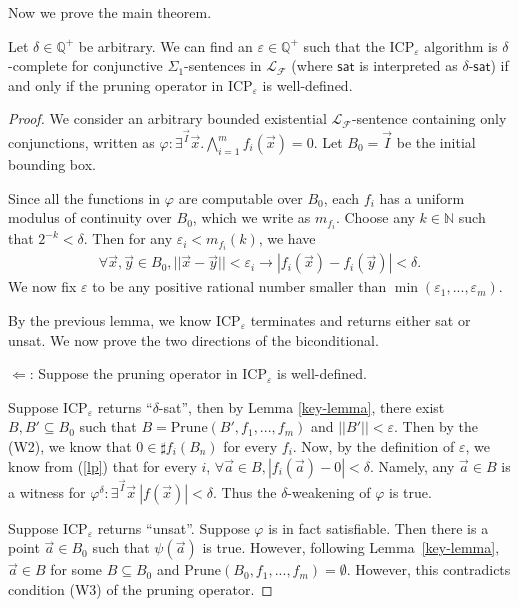 \documentclass[prodmode]{acmsmall} %
\begin{document}
Now we prove the main theorem. 
\begin{theorem}\label{main-theorem}
Let $\delta\in \mathbb{Q}^+$ be arbitrary. We can find an $\varepsilon\in \mathbb{Q}^+$ such that the $\mathrm{ICP}_{\varepsilon}$ algorithm is $\delta$-complete for conjunctive $\Sigma_1$-sentences in $\mathcal{L}_{\mathcal{F}}$ (where $\mathsf{sat}$ is interpreted as $\delta$-$\mathsf{sat}$) if and only if the pruning operator in ICP$_{\varepsilon}$ is well-defined. 
\end{theorem}
\begin{proof}
We consider an arbitrary bounded existential $\mathcal{L}_{\mathcal{F}}$-sentence containing only conjunctions, written as $\varphi: \exists^{\vec I}\vec x. \bigwedge_{i=1}^m f_i(\vec x) = 0$. Let $B_0 = \vec I$ be the initial bounding box. 

Since all the functions in $\varphi$ are computable over $B_0$, each $f_i$ has a uniform modulus of continuity over $B_0$, which we write as $m_{f_i}$. Choose any $k\in \mathbb{N}$ such that $2^{-k}<\delta$. Then for any $\varepsilon_i<m_{f_i}(k)$, we have 
\begin{eqnarray}\label{lp}
\forall \vec x, \vec y\in B_0, ||\vec x-\vec y||<\varepsilon_i\rightarrow |f_i(\vec x)-f_i(\vec y)|<\delta.
\end{eqnarray}
We now fix $\varepsilon$ to be any positive rational number smaller than $\min(\varepsilon_1,...,\varepsilon_m)$.
 
By the previous lemma, we know ICP$_{\varepsilon}$ terminates and returns either {\sf sat} or {\sf unsat}. We now prove the two directions of the biconditional.

$\Leftarrow$: Suppose the pruning operator in ICP$_{\varepsilon}$ is well-defined.

Suppose ICP$_{\varepsilon}$ returns ``$\delta$-sat'', then by Lemma \ref{key-lemma}, there exist $B, B'\subseteq B_0$ such that $B = \mathrm{Prune}(B',f_1,...,f_m)$ and $||B'||<\varepsilon$. Then by the (W2), we know that $0\in \sharp f_i(B_{n})$ for every $f_i$. Now, by the definition of $\varepsilon$, we know from (\ref{lp}) that for every $i$, $\forall \vec a\in B, |f_i(\vec a)-0|<\delta.$ Namely, any $\vec a\in B$ is a witness for $\varphi^{\delta}: \exists^{\vec I} \vec x\ |f(\vec x)|<\delta$. Thus the $\delta$-weakening of $\varphi$ is true. 

Suppose ICP$_{\varepsilon}$ returns ``unsat''. Suppose $\varphi$ is in fact satisfiable. Then there is a point $\vec a\in B_0$ such that $\psi(\vec a)$ is true. However, following Lemma~\ref{key-lemma}, $\vec a\in B$ for some $B\subseteq B_0$ and $\mathrm{Prune}(B_0,f_1,...,f_m) = \emptyset$. However, this contradicts condition (W3) of the pruning operator. 


\end{proof}
\end{document}
